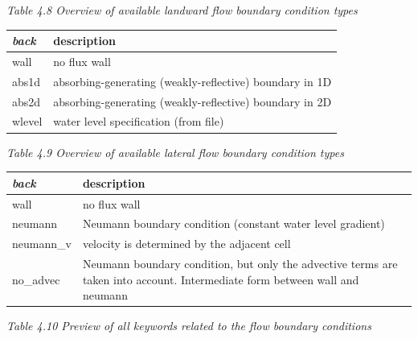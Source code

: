 \documentclass{article}
\begin{document}
\textit{}

\noindent \textit{Table 4.8 Overview of available landward flow boundary condition types}

\begin{tabular}{|p{0.9in}|p{3.2in}|} \hline 
\textit{back} & description \\ \hline 
wall & no flux wall \\ \hline 
abs1d & absorbing-generating (weakly-reflective) boundary in 1D \\ \hline 
abs2d & absorbing-generating (weakly-reflective) boundary in 2D \\ \hline 
wlevel & water level specification (from file) \\ \hline 
\end{tabular}

\textit{}

\noindent \textit{Table 4.9 Overview of available lateral flow boundary condition types}

\begin{tabular}{|p{0.9in}|p{3.2in}|} \hline 
\textit{back} & description \\ \hline 
wall & no flux wall \\ \hline 
neumann & Neumann boundary condition (constant water level gradient) \\ \hline 
neumann\_v & velocity is determined by the adjacent cell \\ \hline 
no\_advec & Neumann boundary condition, but only the advective terms are taken into account. Intermediate form between wall and neumann \\ \hline 
\end{tabular}

\textit{}

\noindent \textit{Table 4.10 Preview of all keywords related to the flow boundary conditions}
\end{document}
